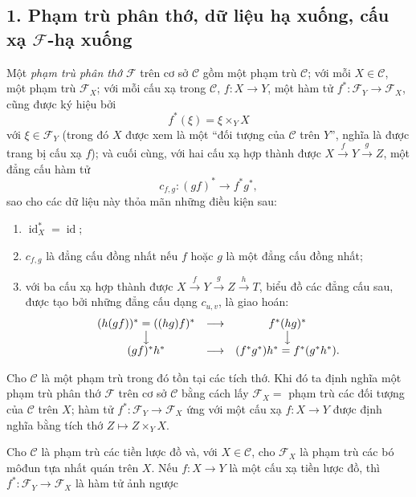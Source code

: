 
\subsection*{1. Phạm trù phân thớ, dữ liệu hạ xuống, cấu xạ
$\mathcal F$-hạ xuống}

 Một \emph{phạm trù phân thớ} $\mathcal F$ trên cơ
sở $\mathcal C$ gồm một phạm trù $\mathcal C$; với mỗi
$X\in\mathcal C$, một phạm trù $\mathcal F_X$; với mỗi cấu xạ trong
$\mathcal C$, $f:X\longrightarrow Y$, một hàm tử
$f^*:\mathcal F_Y\longrightarrow\mathcal F_X$, cũng được ký hiệu bởi
\[
  f^*(\xi)=\xi\times_Y X
\]
với $\xi\in\mathcal F_Y$ (trong đó $X$ được xem là một ``đối tượng của
$\mathcal C$ trên $Y$'', nghĩa là được trang bị cấu xạ $f$); và cuối cùng, với
hai cấu xạ hợp thành được
$X\xrightarrow{f}Y\xrightarrow{g}Z$, một đẳng cấu hàm tử
\[
  c_{f,g}:(gf)^*\longrightarrow f^*g^*,
\]
sao cho các dữ liệu này thỏa mãn những điều kiện sau:

\begin{enumerate}
\item[(i)] $\operatorname{id}_X^*=\operatorname{id}$;
\item[(ii)] $c_{f,g}$ là đẳng cấu đồng nhất nếu $f$ hoặc $g$ là một đẳng cấu
đồng nhất;
\item[(iii)] với ba cấu xạ hợp thành được
$X\xrightarrow{f}Y\xrightarrow{g}Z\xrightarrow{h}T$, biểu đồ các đẳng cấu sau,
được tạo bởi những đẳng cấu dạng $c_{u,v}$, là giao hoán:
\[
\begin{array}{ccc}
  (h(gf))^*=((hg)f)^* & \longrightarrow & f^*(hg)^* \\
  \big\downarrow && \big\downarrow \\
  (gf)^*h^* & \longrightarrow & (f^*g^*)h^*=f^*(g^*h^*).
\end{array}
\]
\end{enumerate}

 Cho $\mathcal C$ là một phạm trù trong đó tồn tại các tích
thớ. Khi đó ta định nghĩa một phạm trù phân thớ $\mathcal F$ trên cơ sở
$\mathcal C$ bằng cách lấy $\mathcal F_X=$ phạm trù các đối tượng của
$\mathcal C$ trên $X$; hàm tử
$f^*:\mathcal F_Y\longrightarrow\mathcal F_X$ ứng với một cấu xạ
$f:X\longrightarrow Y$ được định nghĩa bằng tích thớ
$Z\longmapsto Z\times_YX$.

 Cho $\mathcal C$ là phạm trù các tiền lược đồ và, với
$X\in\mathcal C$, cho $\mathcal F_X$ là phạm trù các bó môđun tựa nhất quán
trên $X$. Nếu $f:X\longrightarrow Y$ là một cấu xạ tiền lược đồ, thì
$f^*:\mathcal F_Y\longrightarrow\mathcal F_X$ là hàm tử ảnh ngược

